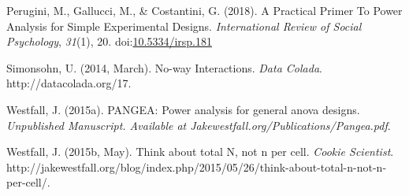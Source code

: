 \documentclass[
  ,jou,floatsintext]{apa6}
\begin{document}
\leavevmode\hypertarget{ref-perugini_practical_2018}{}%
Perugini, M., Gallucci, M., \& Costantini, G. (2018). A Practical Primer To Power Analysis for Simple Experimental Designs. \emph{International Review of Social Psychology}, \emph{31}(1), 20. doi:\href{https://doi.org/10.5334/irsp.181}{10.5334/irsp.181}

\leavevmode\hypertarget{ref-simonsohn_no-way_2014}{}%
Simonsohn, U. (2014, March). No-way Interactions. \emph{Data Colada}. http://datacolada.org/17.

\leavevmode\hypertarget{ref-westfall2015pangea}{}%
Westfall, J. (2015a). PANGEA: Power analysis for general anova designs. \emph{Unpublished Manuscript. Available at Jakewestfall.org/Publications/Pangea.pdf}.

\leavevmode\hypertarget{ref-westfall_think_2015}{}%
Westfall, J. (2015b, May). Think about total N, not n per cell. \emph{Cookie Scientist}. http://jakewestfall.org/blog/index.php/2015/05/26/think-about-total-n-not-n-per-cell/.
\end{document}

